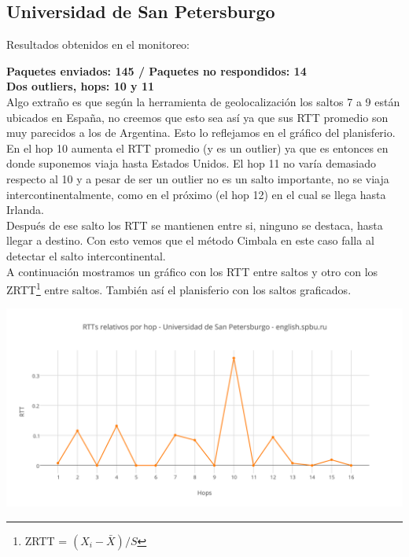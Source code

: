\subsection{Universidad de San Petersburgo}

Resultados obtenidos en el monitoreo:\\

\smallskip

\bigskip

\textbf{Paquetes enviados: 145 / Paquetes no respondidos: 14}\\

\textbf{Dos outliers, hops: 10 y 11}\\

Algo extraño es que según la herramienta de geolocalización los saltos 7 a 9 están ubicados en España, no creemos que esto sea así ya que sus RTT promedio son muy parecidos a los de Argentina. Esto lo reflejamos en el gráfico del planisferio.\\

En el hop 10 aumenta el RTT promedio (y es un outlier) ya que es entonces en donde suponemos viaja hasta Estados Unidos. El hop 11 no varía demasiado respecto al 10 y a pesar de ser un outlier no es un salto importante, no se viaja intercontinentalmente, como en el próximo (el hop 12) en el cual se llega hasta Irlanda.\\

Después de ese salto los RTT se mantienen entre si, ninguno se destaca, hasta llegar a destino. Con esto vemos que el método Cimbala en este caso falla al detectar el salto intercontinental.\\

A continuación mostramos un gráfico con los RTT entre saltos y otro con los ZRTT\footnote{ZRTT = $(X_i - \bar{X}) / S$}  entre saltos. También así el planisferio con los saltos graficados.

\includegraphics[scale=0.65]{imagenes/rusia/RTTs.png} 


